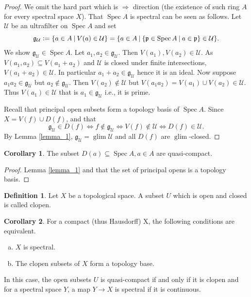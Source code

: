 \documentclass[10pt]{article}
\numberwithin{equation}{section}
\theoremstyle{definition}
\newtheorem{definition}{Definition}[subsection]
\newtheorem{corollary}{Corollary} [subsection]
\DeclareMathOperator{\Spec}{Spec}
\DeclareMathOperator{\glim}{glim}
\newcommand{\defeq}{\vcentcolon=}
\newcommand{\U}[0]{\mathcal{U}}
\newcommand{\sep}[0]{\:|\:}
\newcommand{\g}[0]{\mathfrak{g}}
\begin{document}
\begin{proof}
We omit the hard part which is $\Rightarrow$ direction (the existence of such ring $A$ for every spectral space $X$). That $\Spec A$ is spectral can be seen as follows. Let $\U$ be an ultrafilter on $\Spec A$ and set
\begin{equation*}
    \mathfrak{g}_\U \defeq \{a\in A\sep V(a)\in\U\} = \{a\in A\sep \{\mathfrak{p}\in\Spec A\sep a\in\mathfrak{p}\}\in\U\}.
\end{equation*}
 We show $\mathfrak{g}_\U\in\Spec A$. Let $a_1,a_2\in\mathfrak{g}_\U$. Then $V(a_1),V(a_2)\in\U$. As $V(a_1,a_2)\subseteq V(a_1+a_2)$ and $\U$ is closed under finite intersections, $V(a_1+a_2)\in\U$. In particular $a_1+a_2\in\g_\U$ hence it is an ideal. Now suppose $a_1a_2\in\g_\U$ but $a_2\not\in\g_\U$. Then $V(a_2)\not\in\U$ but $V(a_1a_2) = V(a_1)\cup V(a_2)\in\U$. Thus $V(a_1)\in\U$ that is $a_1\in\g_\U$ i.e., it is prime.
\par Recall that principal open subsets form a topology basis of $\Spec A$. Since $X=V(f)\cup D(f)$, and that
\begin{equation*}
\g_\U\in D(f) \Leftrightarrow f\not\in\g_\U \Leftrightarrow V(f)\not\in \U \Leftrightarrow D(f)\in\U.
\end{equation*}
By Lemma \ref{lemma_1}, $\mathfrak{g}_\U=\glim\U$ and all $D(f)$ are $\glim$-closed.
\end{proof}
\begin{corollary}
    \label{corollary_2}
    The subset $D(a)\subseteq \Spec A, a\in A$ are quasi-compact.
\end{corollary}
\begin{proof}
    Lemma \ref{lemma_1} and that the set of principal opens is a topology basis.
\end{proof}
\begin{definition}
    Let $X$ be a topological space. A subset $U$ which is open and closed is called clopen.
\end{definition}
\begin{corollary}
    \label{corollary_3}
    For a compact (thus Hausdorff) X, the following conditions are equivalent.
    \begin{enumerate}[a.]
        \item $X$ is spectral.
        \item The clopen subsets of $X$ form a topology base.
    \end{enumerate}
    In this case, the open subsets $U$ is quasi-compact if and only if it is clopen and for a spectral space $Y$, a map $Y\to X$ is spectral if it is continuous.
\end{corollary}
\end{document}
